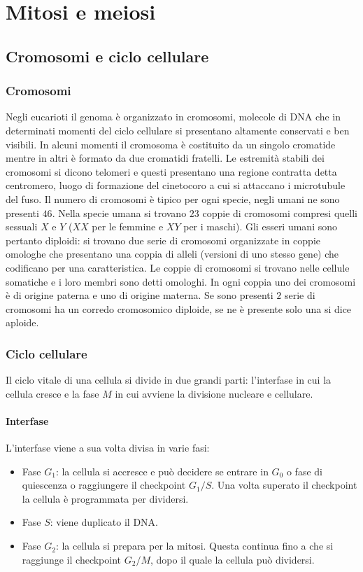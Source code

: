 \chapter{Mitosi e meiosi}
\section{Cromosomi e ciclo cellulare}
\subsection{Cromosomi}
Negli eucarioti il genoma \`e organizzato in cromosomi, molecole di DNA che in determinati momenti del ciclo cellulare si presentano altamente conservati e ben visibili. In alcuni 
momenti il cromosoma \`e costituito da un singolo cromatide mentre in altri \`e formato da due cromatidi fratelli. Le estremit\`a stabili dei cromosomi si dicono telomeri e questi 
presentano una regione contratta detta centromero, luogo di formazione del cinetocoro a cui si attaccano i microtubule del fuso. Il numero di cromosomi \`e tipico per ogni specie, negli
umani ne sono presenti $46$. Nella specie umana si trovano $23$ coppie di cromosomi compresi quelli sessuali $X$ e $Y$ ($XX$ per le femmine e $XY$ per i maschi). Gli esseri umani sono
pertanto diploidi: si trovano due serie di cromosomi organizzate in coppie omologhe che presentano una coppia di alleli (versioni di uno stesso gene) che codificano per una 
caratteristica. Le coppie di cromosomi si trovano nelle cellule somatiche e i loro membri sono detti omologhi. In ogni coppia uno dei cromosomi \`e di origine paterna e uno di origine
materna. Se sono presenti $2$ serie di cromosomi ha un corredo cromosomico diploide, se ne \`e presente solo una si dice aploide. 
\subsection{Ciclo cellulare}
Il ciclo vitale di una cellula si divide in due grandi parti: l'interfase in cui la cellula cresce e la fase $M$ in cui avviene la divisione nucleare e cellulare. 
\subsubsection{Interfase}
L'interfase viene a sua volta divisa in varie fasi: 
\begin{itemize}
	\item Fase $G_1$: la cellula si accresce e pu\`o decidere se entrare in $G_0$ o fase di quiescenza o raggiungere il checkpoint $G_1/S$. Una volta superato il checkpoint la
		cellula \`e programmata per dividersi.
	\item Fase $S$: viene duplicato il DNA.
	\item Fase $G_2$: la cellula si prepara per la mitosi. Questa continua fino a che si raggiunge il checkpoint $G_2/M$, dopo il quale la cellula pu\`o dividersi. 
\end{itemize}
